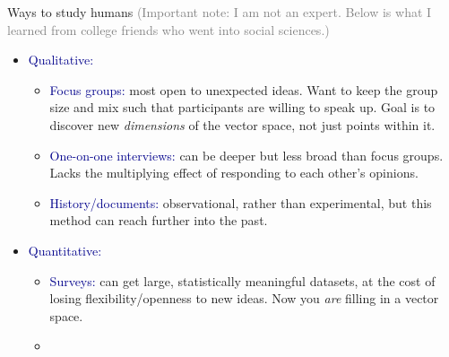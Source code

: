 \documentclass[aspectratio=169]{beamer}
\begin{document}
\begin{frame}{Ways to study humans}
\vspace{0.1 cm}
\textcolor{gray}{\scriptsize (Important note: I am not an expert. Below is what I learned from college friends who went into social sciences.)}

\large
\vspace{0.1 cm}
\begin{itemize}\setlength{\itemsep}{0.25 cm}
\item<1-> \textcolor{darkblue}{Qualitative:}

\vspace{0.05 cm}
\begin{itemize}\large\setlength{\itemsep}{0.15 cm}
\item \textcolor{darkblue}{Focus groups:} \normalsize most open to unexpected ideas. Want to keep the group size and mix such that participants are willing to speak up. Goal is to discover new {\it dimensions} of the vector space, not just points within it. \large

\item \textcolor{darkblue}{One-on-one interviews:} \normalsize can be deeper but less broad than focus groups. Lacks the multiplying effect of responding to each other's opinions. \large

\item \textcolor{darkblue}{History/documents:} \normalsize observational, rather than experimental, but this method can reach further into the past. \large
\end{itemize}

\item<2-> \textcolor{darkblue}{Quantitative:}

\vspace{0.05 cm}
\begin{itemize}\large\setlength{\itemsep}{0.15 cm}
\item \textcolor{darkblue}{Surveys:} \normalsize can get large, statistically meaningful datasets, at the cost of losing flexibility/openness to new ideas. Now you {\it are} filling in a vector space. \large

\item {} \large
\end{itemize}

\end{itemize}

\vspace{10 cm}
\end{frame}
\end{document}
